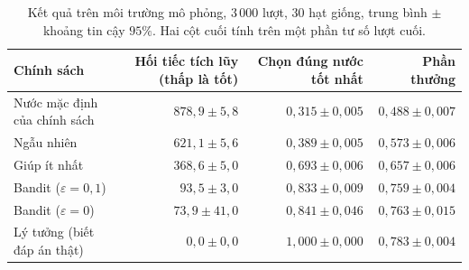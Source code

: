 \begin{table}[H]
\centering
\caption{Kết quả trên môi trường mô phỏng, $3\,000$ lượt, $30$ hạt giống, trung bình $\pm$ khoảng tin cậy $95\%$. Hai cột cuối tính trên một phần tư số lượt cuối.}
\label{tab:bandit-results}
\small
\begin{tabularx}{\linewidth}{@{}Xrrr@{}}
\toprule
Chính sách & Hối tiếc tích lũy (thấp là tốt) & Chọn đúng nước tốt nhất & Phần thưởng \\
\midrule
Nước mặc định của chính sách & $878{,}9 \pm 5{,}8$ & $0{,}315 \pm 0{,}005$ & $0{,}488 \pm 0{,}007$ \\
Ngẫu nhiên & $621{,}1 \pm 5{,}6$ & $0{,}389 \pm 0{,}005$ & $0{,}573 \pm 0{,}006$ \\
Giúp ít nhất & $368{,}6 \pm 5{,}0$ & $0{,}693 \pm 0{,}006$ & $0{,}657 \pm 0{,}006$ \\
Bandit ($\varepsilon=0{,}1$) & $93{,}5 \pm 3{,}0$ & $0{,}833 \pm 0{,}009$ & $0{,}759 \pm 0{,}004$ \\
Bandit ($\varepsilon=0$) & $73{,}9 \pm 41{,}0$ & $0{,}841 \pm 0{,}046$ & $0{,}763 \pm 0{,}015$ \\
Lý tưởng (biết đáp án thật) & $0{,}0 \pm 0{,}0$ & $1{,}000 \pm 0{,}000$ & $0{,}783 \pm 0{,}004$ \\
\bottomrule
\end{tabularx}
\end{table}
